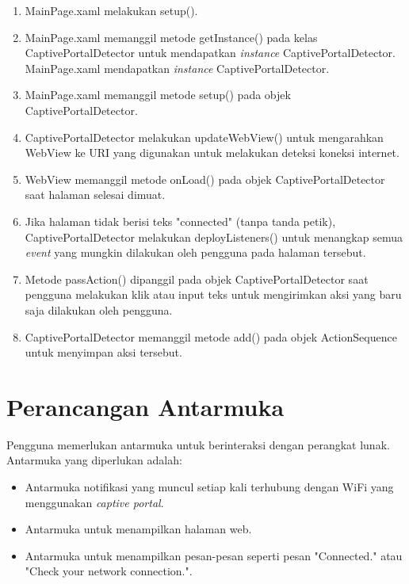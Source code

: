 \begin{enumerate}
    \item{MainPage.xaml melakukan setup().}
    \item{MainPage.xaml memanggil metode getInstance() pada kelas CaptivePortalDetector untuk mendapatkan \textit{instance} CaptivePortalDetector. MainPage.xaml mendapatkan \textit{instance} CaptivePortalDetector.}
    \item{MainPage.xaml memanggil metode setup() pada objek CaptivePortalDetector.}
    \item{CaptivePortalDetector melakukan updateWebView() untuk mengarahkan WebView ke URI yang digunakan untuk melakukan deteksi koneksi internet.}
    \item{WebView memanggil metode onLoad() pada objek CaptivePortalDetector saat halaman selesai dimuat.}
    \item{Jika halaman tidak berisi teks "connected" (tanpa tanda petik), CaptivePortalDetector melakukan deployListeners() untuk menangkap semua \textit{event} yang mungkin dilakukan oleh pengguna pada halaman tersebut.}
    \item{Metode passAction() dipanggil pada objek CaptivePortalDetector saat pengguna melakukan klik atau input teks untuk mengirimkan aksi yang baru saja dilakukan oleh pengguna.}
    \item{CaptivePortalDetector memanggil metode add() pada objek ActionSequence untuk menyimpan aksi tersebut.}
\end{enumerate}



\section{Perancangan Antarmuka}
\label{sec:perancangan_antarmuka}

Pengguna memerlukan antarmuka untuk berinteraksi dengan perangkat lunak. Antarmuka yang diperlukan adalah:

\begin{itemize}
    \item{Antarmuka notifikasi yang muncul setiap kali terhubung dengan WiFi yang menggunakan \textit{captive portal}.}
    \item{Antarmuka untuk menampilkan halaman web.}
    \item{Antarmuka untuk menampilkan pesan-pesan seperti pesan "Connected." atau "Check your network connection.".}
\end{itemize}


